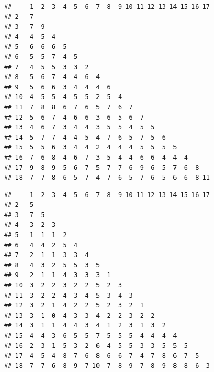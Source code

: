 \documentclass[
]{article}
\newenvironment{Shaded}{\begin{snugshade}}{\end{snugshade}}
\newcommand{\NormalTok}[1]{#1}
\newcommand{\SpecialCharTok}[1]{\textcolor[rgb]{0.00,0.00,0.00}{#1}}
\begin{document}
\begin{verbatim}
##     1  2  3  4  5  6  7  8  9 10 11 12 13 14 15 16 17
## 2   7                                                
## 3   7  9                                             
## 4   4  5  4                                          
## 5   6  6  6  5                                       
## 6   5  5  7  4  5                                    
## 7   4  5  5  3  3  2                                 
## 8   5  6  7  4  4  6  4                              
## 9   5  6  6  3  4  4  4  6                           
## 10  4  5  5  4  5  5  2  5  4                        
## 11  7  8  8  6  7  6  5  7  6  7                     
## 12  5  6  7  4  6  6  3  6  5  6  7                  
## 13  4  6  7  3  4  4  3  5  5  4  5  5               
## 14  5  7  7  4  4  5  4  7  6  5  7  5  6            
## 15  5  5  6  3  4  4  2  4  4  4  5  5  5  5         
## 16  7  6  8  4  6  7  3  5  4  4  6  6  4  4  4      
## 17  9  8  9  5  6  7  5  7  7  6  9  6  5  7  6  8   
## 18  7  7  8  6  5  7  4  7  6  5  7  6  5  6  6  8 11
\end{verbatim}

\begin{Shaded}
\end{Shaded}

\begin{verbatim}
##     1  2  3  4  5  6  7  8  9 10 11 12 13 14 15 16 17
## 2   5                                                
## 3   7  5                                             
## 4   3  2  3                                          
## 5   1  1  1  2                                       
## 6   4  4  2  5  4                                    
## 7   2  1  1  3  3  4                                 
## 8   4  3  2  5  5  3  5                              
## 9   2  1  1  4  3  3  3  1                           
## 10  3  2  2  3  2  2  5  2  3                        
## 11  3  2  2  4  3  4  5  3  4  3                     
## 12  3  2  1  4  2  2  5  2  3  2  1                  
## 13  3  1  0  4  3  3  4  2  2  3  2  2               
## 14  3  1  1  4  4  3  4  1  2  3  1  3  2            
## 15  4  4  3  6  5  5  7  5  5  5  4  4  4  4         
## 16  2  3  1  5  3  2  6  4  5  5  3  3  5  5  5      
## 17  4  5  4  8  7  6  8  6  6  7  4  7  8  6  7  5   
## 18  7  7  6  8  9  7 10  7  8  9  7  8  9  8  8  6  3
\end{verbatim}
\end{document}

